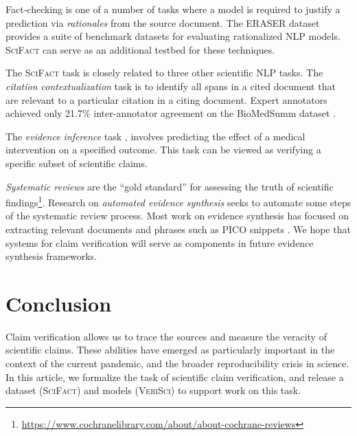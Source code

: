 \documentclass[11pt,a4paper]{article}
\newcommand{\ours}{\textsc{SciFact}\xspace}
\newcommand{\sysname}{\textsc{VeriSci}\xspace}
\begin{document}
Fact-checking is one of a number of tasks where a model is required to justify a prediction via \emph{rationales} from the source document. The ERASER dataset \cite{DeYoung2019ERASERAB} provides a suite of benchmark datasets for evaluating rationalized NLP models. \ours can serve as an additional testbed for these techniques.










\vspace{.2cm} 
\label{sec:related_scinlp}
The \ours task is closely related to three other scientific NLP tasks. 
The \emph{citation contextualization} task \cite{Cohan2015MatchingCT,Jaidka2017TheCS} is to identify all spans in a cited document that are relevant to a particular citation in a citing document. Expert annotators achieved only 21.7\% inter-annotator agreement on the BioMedSumm dataset \cite{BiomedSumm}. 

The \emph{evidence inference} task \cite{Lehman2019InferringWM, DeYoung2020EvidenceI2}, involves predicting the effect of a medical intervention on a specified outcome. This task can be viewed as verifying a specific subset of scientific claims.


\emph{Systematic reviews} are the ``gold standard'' for assessing the truth of scientific findings\footnote{\url{https://www.cochranelibrary.com/about/about-cochrane-reviews}}. Research on \emph{automated evidence synthesis} \cite{Marshall2019TowardSR, Beller2018MakingPW, Tsafnat2014SystematicRA, Marshall2017AutomatingBE} seeks to automate some steps of the systematic review process. Most work on evidence synthesis has focused on extracting relevant documents and phrases such as PICO snippets \cite{Nye2018ACW}. We hope that systems for claim verification will serve as components in future evidence synthesis frameworks.
 \section{Conclusion}

Claim verification allows us to trace the sources and measure the veracity of scientific claims. These abilities have emerged as particularly important in the context of the current pandemic, and the broader reproducibility crisis in science. In this article, we formalize the task of scientific claim verification, and release a dataset (\ours) and models (\sysname) to support work on this task.
\end{document}
